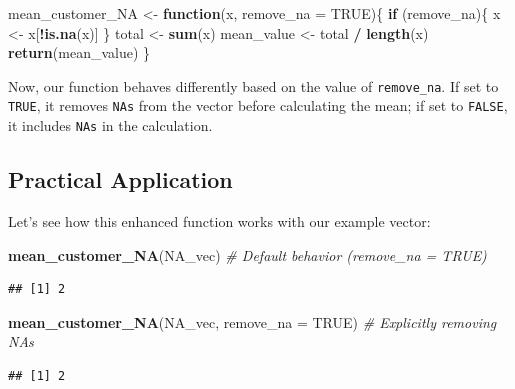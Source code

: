 \documentclass[
]{book}
\newenvironment{Shaded}{\begin{snugshade}}{\end{snugshade}}
\newcommand{\AttributeTok}[1]{\textcolor[rgb]{0.13,0.29,0.53}{#1}}
\newcommand{\CommentTok}[1]{\textcolor[rgb]{0.56,0.35,0.01}{\textit{#1}}}
\newcommand{\ConstantTok}[1]{\textcolor[rgb]{0.56,0.35,0.01}{#1}}
\newcommand{\ControlFlowTok}[1]{\textcolor[rgb]{0.13,0.29,0.53}{\textbf{#1}}}
\newcommand{\FunctionTok}[1]{\textcolor[rgb]{0.13,0.29,0.53}{\textbf{#1}}}
\newcommand{\NormalTok}[1]{#1}
\newcommand{\OtherTok}[1]{\textcolor[rgb]{0.56,0.35,0.01}{#1}}
\newcommand{\SpecialCharTok}[1]{\textcolor[rgb]{0.81,0.36,0.00}{\textbf{#1}}}
\begin{document}
\begin{Shaded}
\begin{Highlighting}[]
\NormalTok{mean\_customer\_NA }\OtherTok{\textless{}{-}} \ControlFlowTok{function}\NormalTok{(x, }\AttributeTok{remove\_na =} \ConstantTok{TRUE}\NormalTok{)\{}
    \ControlFlowTok{if}\NormalTok{ (remove\_na)\{}
\NormalTok{        x }\OtherTok{\textless{}{-}}\NormalTok{ x[}\SpecialCharTok{!}\FunctionTok{is.na}\NormalTok{(x)]}
\NormalTok{    \}}
\NormalTok{    total }\OtherTok{\textless{}{-}} \FunctionTok{sum}\NormalTok{(x)}
\NormalTok{    mean\_value }\OtherTok{\textless{}{-}}\NormalTok{ total }\SpecialCharTok{/} \FunctionTok{length}\NormalTok{(x)}
    \FunctionTok{return}\NormalTok{(mean\_value)}
\NormalTok{\}}
\end{Highlighting}
\end{Shaded}

Now, our function behaves differently based on the value of \texttt{remove\_na}. If set to \texttt{TRUE}, it removes \texttt{NAs} from the vector before calculating the mean; if set to \texttt{FALSE}, it includes \texttt{NAs} in the calculation.

\hypertarget{practical-application}{%
\subsection{Practical Application}\label{practical-application}}

Let's see how this enhanced function works with our example vector:

\begin{Shaded}
\begin{Highlighting}[]
\FunctionTok{mean\_customer\_NA}\NormalTok{(NA\_vec)  }\CommentTok{\# Default behavior (remove\_na = TRUE)}
\end{Highlighting}
\end{Shaded}

\begin{verbatim}
## [1] 2
\end{verbatim}

\begin{Shaded}
\begin{Highlighting}[]
\FunctionTok{mean\_customer\_NA}\NormalTok{(NA\_vec, }\AttributeTok{remove\_na =} \ConstantTok{TRUE}\NormalTok{)  }\CommentTok{\# Explicitly removing NAs}
\end{Highlighting}
\end{Shaded}

\begin{verbatim}
## [1] 2
\end{verbatim}
\end{document}
